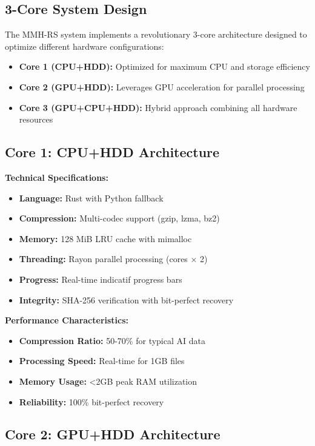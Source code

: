 \documentclass[12pt,a4paper]{article}
\begin{document}
\subsection{3-Core System Design}

The MMH-RS system implements a revolutionary 3-core architecture designed to optimize different hardware configurations:

\begin{itemize}
    \item \textbf{Core 1 (CPU+HDD):} Optimized for maximum CPU and storage efficiency
    \item \textbf{Core 2 (GPU+HDD):} Leverages GPU acceleration for parallel processing
    \item \textbf{Core 3 (GPU+CPU+HDD):} Hybrid approach combining all hardware resources
\end{itemize}

\subsection{Core 1: CPU+HDD Architecture}

\textbf{Technical Specifications:}
\begin{itemize}
    \item \textbf{Language:} Rust with Python fallback
    \item \textbf{Compression:} Multi-codec support (gzip, lzma, bz2)
    \item \textbf{Memory:} 128 MiB LRU cache with mimalloc
    \item \textbf{Threading:} Rayon parallel processing (cores × 2)
    \item \textbf{Progress:} Real-time indicatif progress bars
    \item \textbf{Integrity:} SHA-256 verification with bit-perfect recovery
\end{itemize}

\textbf{Performance Characteristics:}
\begin{itemize}
    \item \textbf{Compression Ratio:} 50-70\% for typical AI data
    \item \textbf{Processing Speed:} Real-time for 1GB files
    \item \textbf{Memory Usage:} <2GB peak RAM utilization
    \item \textbf{Reliability:} 100\% bit-perfect recovery
\end{itemize}

\subsection{Core 2: GPU+HDD Architecture}
\end{document}
